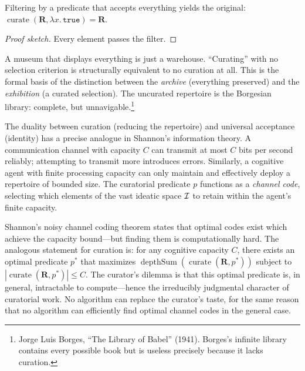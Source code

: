 \begin{theorem}
\label{thm:universal-curate}
Filtering by a predicate that accepts everything yields the original:
$\operatorname{curate}(\mathbf{R}, \lambda x.\, \texttt{true}) = \mathbf{R}$.
\end{theorem}

\begin{proof}[Proof sketch]
Every element passes the filter.
\end{proof}

A museum that displays everything is just a warehouse.  ``Curating'' with no
selection criterion is structurally equivalent to no curation at all.  This
is the formal basis of the distinction between the \emph{archive}
(everything preserved) and the \emph{exhibition} (a curated selection).
The uncurated repertoire is the Borgesian library: complete, but
unnavigable.\footnote{Jorge Luis Borges, ``The Library of Babel'' (1941).
Borges's infinite library contains every possible book but is useless
precisely because it lacks curation.}

\begin{remark}
\label{rem:channel-capacity}
The duality between curation (reducing the repertoire) and universal
acceptance (identity) has a precise analogue in Shannon's information
theory.  A communication channel with capacity $C$ can transmit at most
$C$ bits per second reliably; attempting to transmit more introduces
errors.  Similarly, a cognitive agent with finite processing capacity
can only maintain and effectively deploy a repertoire of bounded size.
The curatorial predicate $p$ functions as a \emph{channel code},
selecting which elements of the vast ideatic space $\mathcal{I}$ to retain
within the agent's finite capacity.

Shannon's noisy channel coding theorem states that optimal codes exist
which achieve the capacity bound---but finding them is computationally
hard.  The analogous statement for curation is: for any cognitive
capacity $C$, there exists an optimal predicate $p^*$ that maximizes
$\operatorname{depthSum}(\operatorname{curate}(\mathbf{R}, p^*))$
subject to $|\operatorname{curate}(\mathbf{R}, p^*)| \le C$.  The
curator's dilemma is that this optimal predicate is, in general,
intractable to compute---hence the irreducibly judgmental character of
curatorial work.  No algorithm can replace the curator's taste, for
the same reason that no algorithm can efficiently find optimal channel
codes in the general case.
\end{remark}

